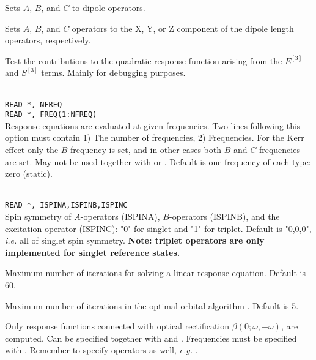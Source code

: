 \begin{description}
\item{}
Sets $A$, $B$, and $C$ to dipole operators.

\item{}
Sets $A$, $B$, and $C$ operators to the X, Y, or Z component of the
dipole length operators, respectively. 

\item{}
Test the contributions to the quadratic response function arising from
the $E^{\left[3\right]}$ and $S^{\left[3\right]}$ terms.  Mainly for
debugging purposes. 

\item{}\\
\verb|READ *, NFREQ|\\
\verb|READ *, FREQ(1:NFREQ)|\\
Response equations are evaluated at given
frequencies. Two lines 
following this option must contain 1) The number of frequencies, 2)
Frequencies.
For the Kerr effect only the $B$-frequency is set,
and in other cases both $B$ and $C$-frequencies are set.
May not be used together with  or .
Default is one frequency of each type: zero (static).

\item{}\\
\verb|READ *, ISPINA,ISPINB,ISPINC|\\
Spin symmetry of $A$-operators (ISPINA), $B$-operators (ISPINB),
and the excitation operator (ISPINC): "0" for singlet and "1" for triplet.
Default is "0,0,0", {\it i.e.\/} all of singlet spin symmetry.
{\bf Note: triplet operators are only implemented for singlet reference states.}
\item{}
Maximum number of iterations for solving a linear response equation.
Default is 60.

\item{}
Maximum number of iterations in the optimal
orbital algorithm 
\cite{tuhjahjajpjjcp84}. 
Default is 5.

\item{}
Only response functions connected with optical rectification
$\beta(0; \omega,-\omega)$, are computed.
Can be specified together with  and .
Frequencies must be specified with .
Remember to specify operators as well, {\it e.g.\/} .


\end{description}
